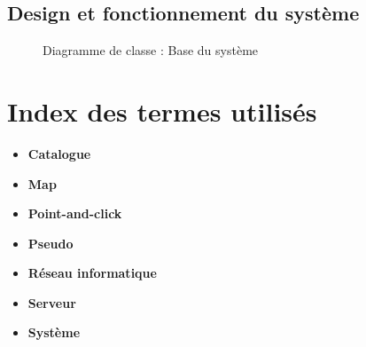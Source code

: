 \documentclass[a4paper,11pt]{report}
\begin{document}
\section{Design et fonctionnement du système}
\begin{figure}[ht]
    \caption{Diagramme de classe : Base du système}
\end{figure}


\newpage
\chapter{Index des termes utilisés}
\begin{itemize}
 \item \textbf{Catalogue}
 \item \textbf{Map}
 \item \textbf{Point-and-click}
 \item \textbf{Pseudo}
 \item \textbf{Réseau informatique}
 \item \textbf{Serveur}
 \item \textbf{Système}
\end{itemize}
\end{document}
